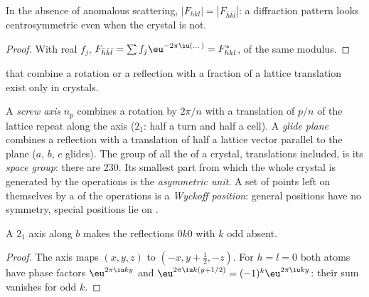 \begin{proposition}\label{prop:b3:x-ray-diffraction:friedel}
In the absence of anomalous scattering, $|F_{hkl}| = |F_{\bar h\bar k\bar l}|$: a diffraction
pattern looks centrosymmetric even when the crystal is not.
\end{proposition}

\begin{proof}
With real $f_j$, $F_{\bar h\bar k\bar l} = \sum f_j\eu^{-2\pi\iu(\dots)} = F_{hkl}^*$, of the same
modulus.
\end{proof}

 that combine a rotation or a reflection with a fraction of a
lattice translation exist only in crystals.

\begin{definition}\label{def:b3:x-ray-diffraction:space-group}
A \emph{screw axis} $n_p$ combines a rotation by $2\pi/n$ with a
translation of $p/n$ of the lattice repeat along the axis ($2_1$: half a turn and
half a cell). A \emph{glide plane} combines a reflection with a
translation of half a lattice vector parallel to the plane ($a$, $b$, $c$ glides).
The group of all the  of a crystal, translations included,
is its \emph{space group}: there are 230. Its smallest part
from which the whole crystal is generated by the operations is the
\emph{asymmetric unit}. A set of points left on
themselves by a  of the operations is a \emph{Wyckoff
position}: general positions have no symmetry, special
positions lie on .
\end{definition}

\begin{proposition}\label{prop:b3:x-ray-diffraction:screw-absence}
A $2_1$ axis along $b$ makes the reflections $0k0$ with $k$ odd absent.
\end{proposition}

\begin{proof}
The axis maps $(x, y, z)$ to $(-x, y + \frac12, -z)$. For $h = l = 0$ both atoms have
phase factors $\eu^{2\pi\iu ky}$ and $\eu^{2\pi\iu k(y + 1/2)} = (-1)^k\eu^{2\pi\iu ky}$: their sum
vanishes for odd $k$.
\end{proof}

